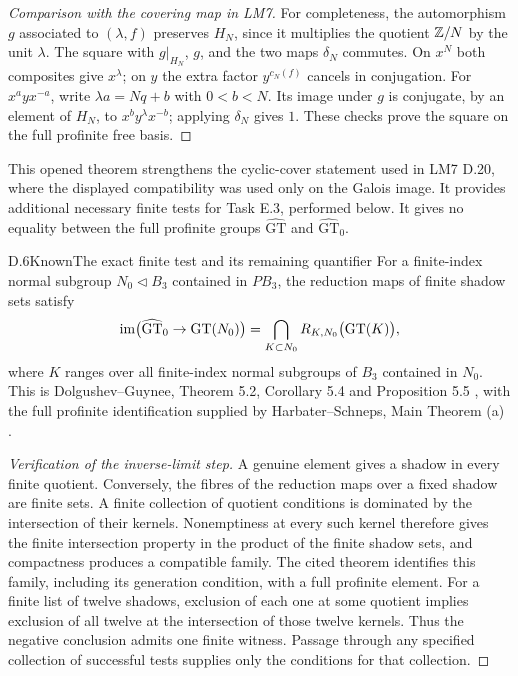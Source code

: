 \begin{proof}[Comparison with the covering map in LM7]
For completeness, the automorphism $g$ associated to $(\lambda,f)$
preserves $H_N$, since it multiplies the quotient $\mathbb Z/N$ by the unit
$\lambda$. The square with $g|_{H_N}$, $g$, and the two maps
$\delta_N$ commutes. On $x^N$ both composites give $x^\lambda$;
on $y$ the extra factor $y^{c_N(f)}$ cancels in conjugation.
For $x^ayx^{-a}$, write $\lambda a=Nq+b$ with
$0<b<N$. Its image under $g$ is conjugate, by an element of $H_N$,
to $x^by^\lambda x^{-b}$; applying $\delta_N$ gives $1$.
These checks prove the square on the full profinite free basis.
\end{proof}

This opened theorem strengthens the cyclic-cover statement used in
LM7 D.20, where the displayed compatibility was used only on the
Galois image. It provides additional necessary finite tests for Task
E.3, performed below. It gives no equality between the full profinite
groups $\widehat{\mathrm{GT}}$ and $\widehat{\mathrm{GT}}_0$.

\begin{statement}{D.6}{Known}{The exact finite test and its remaining quantifier}
For a finite-index normal subgroup $N_0\triangleleft B_3$ contained in
$PB_3$, the reduction maps of finite shadow sets satisfy
\[
 \operatorname{im}\bigl(\widehat{\mathrm{GT}}_0\to\mathrm{GT}(N_0)\bigr)
 =\bigcap_{K\subset N_0}
 R_{K,N_0}\bigl(\mathrm{GT}(K)\bigr),
\]
where $K$ ranges over all finite-index normal subgroups of $B_3$
contained in $N_0$. This is Dolgushev--Guynee, Theorem 5.2,
Corollary 5.4 and Proposition 5.5 \cite{DE_DolgushevGuynee2024},
with the full profinite identification supplied by Harbater--Schneps,
Main Theorem (a) \cite{DE_HarbaterSchneps2000}.
\end{statement}
\begin{proof}[Verification of the inverse-limit step]
A genuine element gives a shadow in every finite quotient. Conversely,
the fibres of the reduction maps over a fixed shadow are finite sets.
A finite collection of quotient conditions is dominated by the
intersection of their kernels. Nonemptiness at every such kernel
therefore gives the finite intersection property in the product of the
finite shadow sets, and compactness produces a compatible family.
The cited theorem identifies this family, including its generation
condition, with a full profinite element. For a finite list of twelve
shadows, exclusion of each one at some quotient implies exclusion of
all twelve at the intersection of those twelve kernels. Thus the
negative conclusion admits one finite witness. Passage through any
specified collection of successful tests supplies only the conditions
for that collection.
\end{proof}

